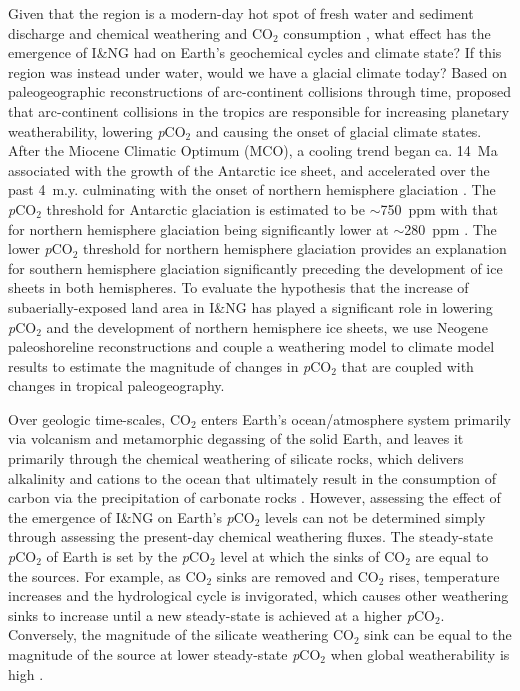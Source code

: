 \documentclass[11pt,letterpaper]{article}
\newcommand{\pCOtwo}{\textit{p}CO$_{2}$\xspace}
\newcommand{\COtwo}{CO$_{2}$\xspace}
\begin{document}
Given that the region is a modern-day hot spot of fresh water and sediment discharge \citep{Milliman2013a} and chemical weathering and \COtwo consumption \citep{Hartmann2009a}, what effect has the emergence of I\&NG had on Earth's geochemical cycles and climate state? If this region was instead under water, would we have a glacial climate today? Based on paleogeographic reconstructions of arc-continent collisions through time, \citet{Macdonald2019a} proposed that arc-continent collisions in the tropics are responsible for increasing planetary weatherability, lowering \pCOtwo and causing the onset of glacial climate states. After the Miocene Climatic Optimum (MCO), a cooling trend began ca. 14~Ma associated with the growth of the Antarctic ice sheet, and accelerated over the past 4~m.y. culminating with the onset of northern hemisphere glaciation \citep{Shackleton1984a, Zachos2001a}. The \pCOtwo threshold for Antarctic glaciation is estimated to be $\sim$750~ppm with that for northern hemisphere glaciation being significantly lower at $\sim$280~ppm \citep{DeConto2008a}. The lower \pCOtwo threshold for northern hemisphere glaciation provides an explanation for southern hemisphere glaciation significantly preceding the development of ice sheets in both hemispheres. To evaluate the hypothesis that the increase of subaerially-exposed land area in I\&NG has played a significant role in lowering \pCOtwo and the development of northern hemisphere ice sheets, we use Neogene paleoshoreline reconstructions and couple a weathering model to climate model results to estimate the magnitude of changes in \pCOtwo that are coupled with changes in tropical paleogeography.

Over geologic time-scales, \COtwo enters Earth's ocean/atmosphere system primarily via volcanism and metamorphic degassing of the solid Earth, and leaves it primarily through the chemical weathering of silicate rocks, which delivers alkalinity and cations to the ocean that ultimately result in the consumption of carbon via the precipitation of carbonate rocks \citep{Kump2000a}. However, assessing the effect of the emergence of I\&NG on Earth's \pCOtwo levels can not be determined simply through assessing the present-day chemical weathering fluxes. The steady-state \pCOtwo of Earth is set by the \pCOtwo level at which the sinks of \COtwo are equal to the sources. For example, as \COtwo sinks are removed and \COtwo rises, temperature increases and the hydrological cycle is invigorated, which causes other weathering sinks to increase until a new steady-state is achieved at a higher \pCOtwo. Conversely, the magnitude of the silicate weathering \COtwo sink can be equal to the magnitude of the source at lower steady-state \pCOtwo when global weatherability is high \citep{Kump1997a}.
\end{document}
